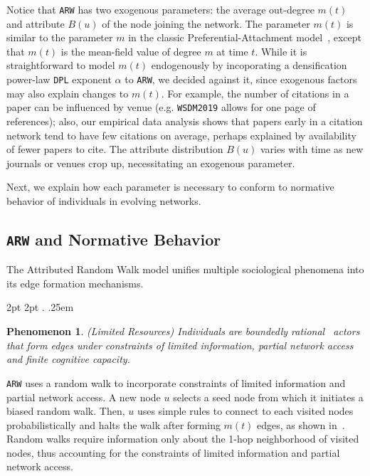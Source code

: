 Notice that \texttt{ARW} has two exogenous parameters:  the average out-degree $m(t)$ and attribute $B(u)$ of the node joining the network. The parameter $m(t)$ is similar to the parameter $m$ in the classic Preferential-Attachment model~\cite{barabasi1999emergence}, except that $m(t)$ is the mean-field value of degree $m$ at time $t$. While it is straightforward to model $m(t)$ endogenously by incoporating a densification power-law \texttt{DPL} exponent $\alpha$ to \texttt{ARW}, we decided against it, since exogenous factors may also explain changes to $m(t)$. For example, the number of citations in a paper can be influenced by venue (e.g. \texttt{WSDM2019} allows for one page of references); also, our empirical data analysis shows that papers early in a citation network tend to have few citations on average, perhaps explained by availability of {fewer} papers to cite. The attribute distribution $B(u)$ varies with time as new journals or venues crop up, necessitating an exogenous parameter.



Next, we explain how each parameter is necessary to conform to normative
behavior of individuals in evolving networks.

\subsection{\texttt{ARW} and Normative Behavior}
\label{sub:Model Interpretation}

The Attributed Random Walk model unifies multiple sociological phenomena
into its edge formation mechanisms.

  {2pt} %
  {2pt} %
  {\itshape} %
  {} %
  {\bfseries} %
  {.} %
  {.25em} %
  {} %

\theoremstyle{exampstyle} \newtheorem{ph}{Phenomenon}

\begin{ph}
	(Limited Resources) Individuals are boundedly rational~\cite{simon1972theories,gigerenzer1996reasoning,lipman1995information}
	actors that form edges under constraints of limited information, partial network access and finite cognitive capacity.
\end{ph}
\texttt{ARW} uses a random walk to incorporate constraints of limited information
and partial network access. A new node $u$ selects a seed node from which it
initiates a biased random walk. Then, $u$ uses simple rules to connect to each visited
nodes probabilistically and halts the walk after forming $m(t)$ edges, as shown in~. Random walks require information only about the
1-hop neighborhood of visited nodes, thus accounting for  the constraints of limited information and partial network access.

